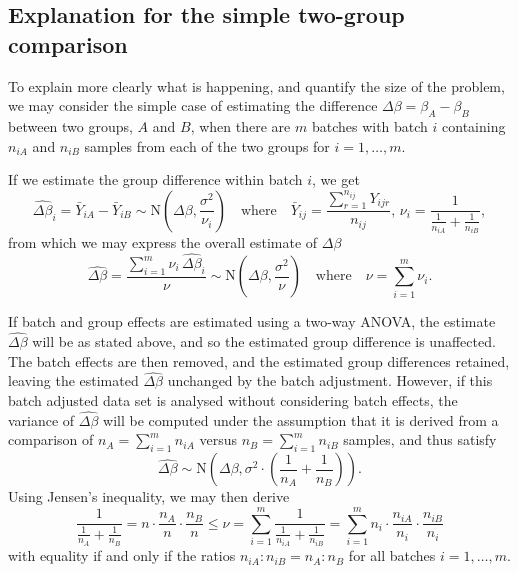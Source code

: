 \documentclass{bio}
\begin{document}

\subsection{Explanation for the simple two-group comparison}

To explain more clearly what is happening, and quantify the size of the problem, we may consider the simple case of estimating the difference $\Delta\beta=\beta_A-\beta_B$ between two groups, $A$ and $B$, when there are $m$ batches with batch $i$ containing $n_{iA}$ and $n_{iB}$ samples from each of the two groups for $i=1,\ldots,m$.

If we estimate the group difference within batch $i$, we get
\begin{equation}
\widehat{\Delta\beta}_i=\bar{Y}_{iA}-\bar{Y}_{iB}\sim\text{N}\left(\Delta\beta,\frac{\sigma^2}{\nu_i}\right)
\quad\text{where}\quad
\bar{Y}_{ij}=\frac{\sum_{r=1}^{n_{ij}}Y_{ijr}}{n_{ij}},\,
\nu_i=\frac{1}{\frac{1}{n_{iA}}+\frac{1}{n_{iB}}},
\end{equation}
from which we may express the overall estimate of $\Delta\beta$
\begin{equation}
\widehat{\Delta\beta}=\frac{\sum_{i=1}^m \nu_i\,\widehat{\Delta\beta}_i}{\nu}
\sim\text{N}\left(\Delta\beta,\frac{\sigma^2}{\nu}\right)
\quad\text{where}\quad
\nu=\sum_{i=1}^m\nu_i.
\end{equation}

If batch and group effects are estimated using a two-way ANOVA, the estimate $\widehat{\Delta\beta}$ will be as stated above, and so the estimated group difference is unaffected. The batch effects are then removed, and the estimated group differences retained, leaving the estimated $\widehat{\Delta\beta}$ unchanged by the batch adjustment. However, if this batch adjusted data set is analysed without considering batch effects, the variance of $\widehat{\Delta\beta}$ will be computed under the assumption that it is derived from a comparison of $n_A=\sum_{i=1}^m n_{iA}$ versus $n_B=\sum_{i=1}^m n_{iB}$ samples, and thus satisfy
\begin{equation}
\widehat{\Delta\beta}
\sim\text{N}\left(\Delta\beta,\sigma^2\cdot\left(\frac{1}{n_A}+\frac{1}{n_B}\right)\right).
\end{equation}
Using Jensen's inequality, we may then derive
\begin{equation}
\frac{1}{\frac{1}{n_A}+\frac{1}{n_B}}=n\cdot\frac{n_A}{n}\cdot\frac{n_B}{n}
\le
\nu
=\sum_{i=1}^m \frac{1}{\frac{1}{n_{iA}}+\frac{1}{n_{iB}}}
=\sum_{i=1}^m n_i\cdot\frac{n_{iA}}{n_i}\cdot\frac{n_{iB}}{n_i}
\end{equation}
with equality if and only if the ratios $n_{iA}:n_{iB}=n_A:n_B$ for all batches $i=1,\ldots,m$.
\end{document}

